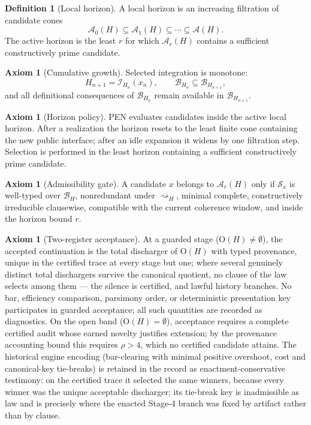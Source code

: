\documentclass[11pt]{article}
\theoremstyle{plain}
\theoremstyle{definition}
\newtheorem{definition}[theorem]{Definition}
\newtheorem{axiom}[theorem]{Axiom}
\theoremstyle{remark}
\newcommand{\B}{\mathcal{B}}
\newcommand{\A}{\mathcal{A}}
\newcommand{\I}{\mathcal{I}}
\begin{document}
\begin{definition}[Local horizon]
A local horizon is an increasing filtration of candidate cones
\[
\A_0(H)\subseteq \A_1(H)\subseteq\cdots\subseteq\A(H).
\]
The active horizon is the least \(r\) for which \(\A_r(H)\) contains a sufficient constructively prime candidate.
\end{definition}

\begin{axiom}[Cumulative growth]
Selected integration is monotone:
\[
H_{n+1}=\I_{H_n}(x_n),
\qquad
\B_{H_n}\subseteq \B_{H_{n+1}},
\]
and all definitional consequences of \(\B_{H_n}\) remain available in \(\B_{H_{n+1}}\).
\end{axiom}

\begin{axiom}[Horizon policy]
PEN evaluates candidates inside the active local horizon. After a realization the horizon resets to the least finite cone containing the new public interface; after an idle expansion it widens by one filtration step. Selection is performed in the least horizon containing a sufficient constructively prime candidate.
\end{axiom}

\begin{axiom}[Admissibility gate]
A candidate \(x\) belongs to \(\A_r(H)\) only if \(\mathcal{S}_x\) is well-typed over \(\B_H\), nonredundant under \(\rightsquigarrow_H\), minimal complete, constructively irreducible clausewise, compatible with the current coherence window, and inside the horizon bound \(r\).
\end{axiom}

\begin{axiom}[Two-register acceptance]
At a guarded stage (\(\mathrm{O}(H)\neq\emptyset\)), the accepted continuation is the total discharger of \(\mathrm{O}(H)\) with typed provenance, unique in the certified trace at every stage but one; where several genuinely distinct total dischargers survive the canonical quotient, no clause of the law selects among them --- the silence is certified, and lawful history branches. No bar, efficiency comparison, parsimony order, or deterministic presentation key participates in guarded acceptance; all such quantities are recorded as diagnostics. On the open band (\(\mathrm{O}(H)=\emptyset\)), acceptance requires a complete certified audit whose earned novelty justifies extension; by the provenance accounting bound this requires \(\rho>4\), which no certified candidate attains. The historical engine encoding (bar-clearing with minimal positive overshoot, cost and canonical-key tie-breaks) is retained in the record as enactment-conservative testimony: on the certified trace it selected the same winners, because every winner was the unique acceptable discharger; its tie-break key is inadmissible as law and is precisely where the enacted Stage-4 branch was fixed by artifact rather than by clause.
\end{axiom}
\end{document}
